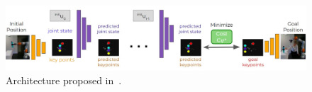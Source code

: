\begin{figure}[th]
    \centering
    \includegraphics[width=\textwidth]{figures/images/model_based_irl/model_based_irl.jpg}
    \caption{Architecture proposed in~\cite{das2021model_based_irl_from_vd}.}
    \label{fig:model_based_irl}
\end{figure}
